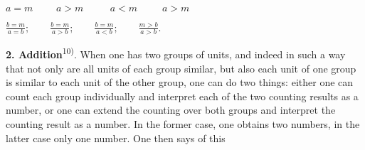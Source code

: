 \thispagestyle{fancy}

\vspace{0.5cm}

\begin{center}
$\displaystyle a = m \qquad \,\, a > m \qquad \,\,\,\, a < m \qquad \,\,\, a > m$

$\displaystyle \frac{b = m}{a = b}; \qquad \frac{b = m}{a > b}; \qquad \frac{b = m}{a < b}; \qquad \frac{m > b}{a > b}.$
\end{center}

\textbf{2. Addition}\textsuperscript{10)}. When one has two groups of units, and indeed in such a way that not only are all units of each group similar, but also each unit of one group is similar to each unit of the other group, one can do two things: either one can count each group individually and interpret each of the two counting results as a number, or one can extend the counting over both groups and interpret the counting result as a number. In the former case, one obtains two numbers, in the latter case only one number. One then says of this

